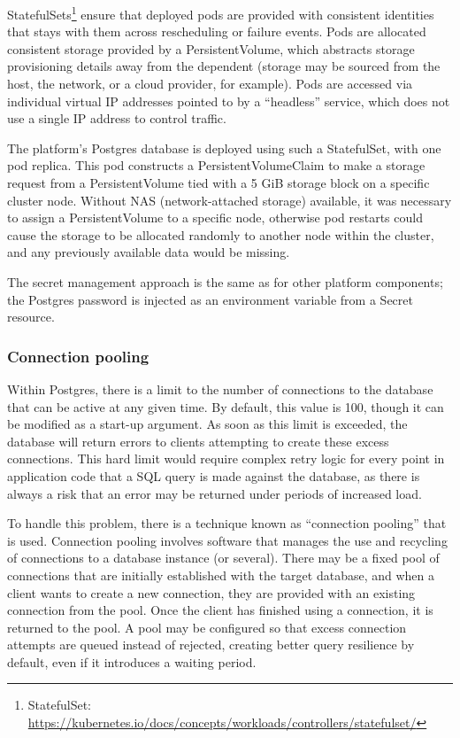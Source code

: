 StatefulSets\footnote{StatefulSet: \url{https://kubernetes.io/docs/concepts/workloads/controllers/statefulset/}} ensure that deployed pods are provided with consistent identities that stays with them across rescheduling or failure events. Pods are allocated consistent storage provided by a PersistentVolume, which abstracts storage provisioning details away from the dependent (storage may be sourced from the host, the network, or a cloud provider, for example). Pods are accessed via individual virtual IP addresses pointed to by a ``headless'' service, which does not use a single IP address to control traffic.

The platform's Postgres database is deployed using such a StatefulSet, with one pod replica. This pod constructs a PersistentVolumeClaim to make a storage request from a PersistentVolume tied with a 5 GiB storage block on a specific cluster node. Without NAS (network-attached storage) available, it was necessary to assign a PersistentVolume to a specific node, otherwise pod restarts could cause the storage to be allocated randomly to another node within the cluster, and any previously available data would be missing.

The secret management approach is the same as for other platform components; the Postgres password is injected as an environment variable from a Secret resource.

\subsubsection{Connection pooling}

Within Postgres, there is a limit to the number of connections to the database that can be active at any given time. By default, this value is 100, though it can be modified as a start-up argument. As soon as this limit is exceeded, the database will return errors to clients attempting to create these excess connections. This hard limit would require complex retry logic for every point in application code that a SQL query is made against the database, as there is always a risk that an error may be returned under periods of increased load.

To handle this problem, there is a technique known as ``connection pooling'' that is used. Connection pooling involves software that manages the use and recycling of connections to a database instance (or several). There may be a fixed pool of connections that are initially established with the target database, and when a client wants to create a new connection, they are provided with an existing connection from the pool. Once the client has finished using a connection, it is returned to the pool. A pool may be configured so that excess connection attempts are queued instead of rejected, creating better query resilience by default, even if it introduces a waiting period.

